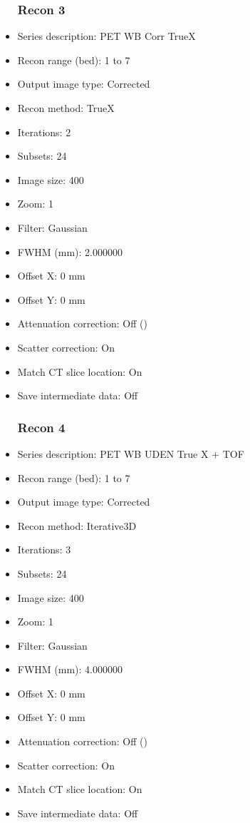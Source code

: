 \documentclass[12pt]{article}
\begin{document}
\begin{itemize}
\subsubsection{Recon 3}
\item Series description: PET WB Corr TrueX
\item Recon range (bed): 1 to 7
\item Output image type: Corrected
\item Recon method: TrueX
\item Iterations: 2
\item Subsets: 24
\item Image size: 400
\item Zoom: 1
\item Filter: Gaussian
\item FWHM (mm): 2.000000
\item Offset X: 0 mm
\item Offset Y: 0 mm
\item Attenuation correction: Off ()
\item Scatter correction: On
\item Match CT slice location: On
\item Save intermediate data: Off
\subsubsection{Recon 4}
\item Series description: PET WB UDEN True X + TOF
\item Recon range (bed): 1 to 7
\item Output image type: Corrected
\item Recon method: Iterative3D
\item Iterations: 3
\item Subsets: 24
\item Image size: 400
\item Zoom: 1
\item Filter: Gaussian
\item FWHM (mm): 4.000000
\item Offset X: 0 mm
\item Offset Y: 0 mm
\item Attenuation correction: Off ()
\item Scatter correction: On
\item Match CT slice location: On
\item Save intermediate data: Off

\end{itemize}
\end{document}
